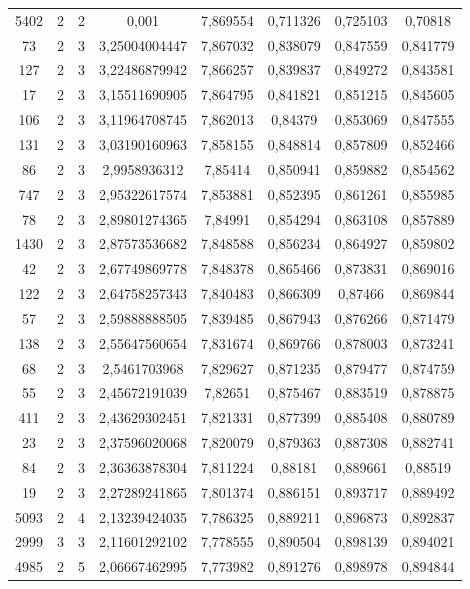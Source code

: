 \begin{longtable}{|c|c|c|c|c|c|c|c|}
5402 & 2 & 2 & 0,001 & 7,869554 & 0,711326 & 0,725103 & 0,70818 \\
73 & 2 & 3 & 3,25004004447 & 7,867032 & 0,838079 & 0,847559 & 0,841779 \\
127 & 2 & 3 & 3,22486879942 & 7,866257 & 0,839837 & 0,849272 & 0,843581 \\
17 & 2 & 3 & 3,15511690905 & 7,864795 & 0,841821 & 0,851215 & 0,845605 \\
106 & 2 & 3 & 3,11964708745 & 7,862013 & 0,84379 & 0,853069 & 0,847555 \\
131 & 2 & 3 & 3,03190160963 & 7,858155 & 0,848814 & 0,857809 & 0,852466 \\
86 & 2 & 3 & 2,9958936312 & 7,85414 & 0,850941 & 0,859882 & 0,854562 \\
747 & 2 & 3 & 2,95322617574 & 7,853881 & 0,852395 & 0,861261 & 0,855985 \\
78 & 2 & 3 & 2,89801274365 & 7,84991 & 0,854294 & 0,863108 & 0,857889 \\
1430 & 2 & 3 & 2,87573536682 & 7,848588 & 0,856234 & 0,864927 & 0,859802 \\
42 & 2 & 3 & 2,67749869778 & 7,848378 & 0,865466 & 0,873831 & 0,869016 \\
122 & 2 & 3 & 2,64758257343 & 7,840483 & 0,866309 & 0,87466 & 0,869844 \\
57 & 2 & 3 & 2,59888888505 & 7,839485 & 0,867943 & 0,876266 & 0,871479 \\
138 & 2 & 3 & 2,55647560654 & 7,831674 & 0,869766 & 0,878003 & 0,873241 \\
68 & 2 & 3 & 2,5461703968 & 7,829627 & 0,871235 & 0,879477 & 0,874759 \\
55 & 2 & 3 & 2,45672191039 & 7,82651 & 0,875467 & 0,883519 & 0,878875 \\
411 & 2 & 3 & 2,43629302451 & 7,821331 & 0,877399 & 0,885408 & 0,880789 \\
23 & 2 & 3 & 2,37596020068 & 7,820079 & 0,879363 & 0,887308 & 0,882741 \\
84 & 2 & 3 & 2,36363878304 & 7,811224 & 0,88181 & 0,889661 & 0,88519 \\
19 & 2 & 3 & 2,27289241865 & 7,801374 & 0,886151 & 0,893717 & 0,889492 \\
5093 & 2 & 4 & 2,13239424035 & 7,786325 & 0,889211 & 0,896873 & 0,892837 \\
2999 & 3 & 3 & 2,11601292102 & 7,778555 & 0,890504 & 0,898139 & 0,894021 \\
4985 & 2 & 5 & 2,06667462995 & 7,773982 & 0,891276 & 0,898978 & 0,894844 \\

\end{longtable}
